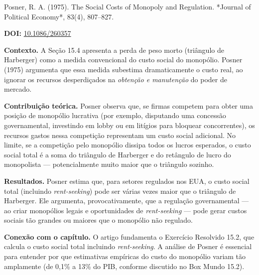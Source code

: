 \documentclass[11pt,twoside,openright]{book}
\begin{document}
\begin{pesquisabox}{Posner, R. A. (1975). The Social Costs of Monopoly and Regulation. *Journal of Political Economy*, 83(4), 807–827.}

\textbf{DOI:} \href{https://doi.org/10.1086/260357}{10.1086/260357}

\textbf{Contexto.} A Seção 15.4 apresenta a perda de peso morto
(triângulo de Harberger) como a medida convencional do custo social do
monopólio. Posner (1975) argumenta que essa medida subestima
dramaticamente o custo real, ao ignorar os recursos desperdiçados na
\emph{obtenção e manutenção} do poder de mercado.

\textbf{Contribuição teórica.} Posner observa que, se firmas competem
para obter uma posição de monopólio lucrativa (por exemplo, disputando
uma concessão governamental, investindo em lobby ou em litígios para
bloquear concorrentes), os recursos gastos nessa competição representam
um custo social adicional. No limite, se a competição pelo monopólio
dissipa todos os lucros esperados, o custo social total é a soma do
triângulo de Harberger e do retângulo de lucro do monopolista ---
potencialmente muito maior que o triângulo sozinho.

\textbf{Resultados.} Posner estima que, para setores regulados nos EUA,
o custo social total (incluindo \emph{rent-seeking}) pode ser várias
vezes maior que o triângulo de Harberger. Ele argumenta,
provocativamente, que a regulação governamental --- ao criar monopólios
legais e oportunidades de \emph{rent-seeking} --- pode gerar custos
sociais tão grandes ou maiores que o monopólio não regulado.

\textbf{Conexão com o capítulo.} O artigo fundamenta o Exercício
Resolvido 15.2, que calcula o custo social total incluindo
\emph{rent-seeking}. A análise de Posner é essencial para entender por
que estimativas empíricas do custo do monopólio variam tão amplamente
(de 0,1\% a 13\% do PIB, conforme discutido no Box Mundo 15.2).

\end{pesquisabox}
\end{document}
